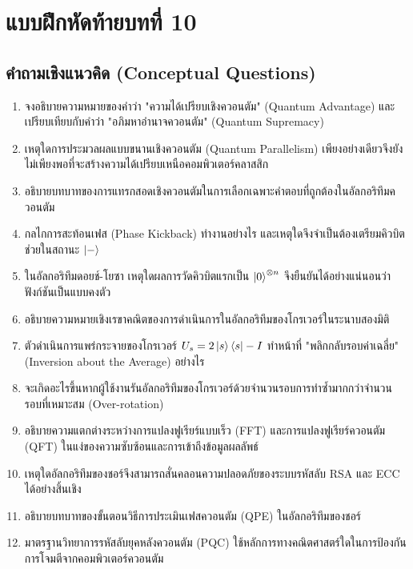 \section*{แบบฝึกหัดท้ายบทที่ 10}

\subsection*{คำถามเชิงแนวคิด (Conceptual Questions)}

\begin{enumerate}[label=\textbf{\arabic*.}]
    \item จงอธิบายความหมายของคำว่า "ความได้เปรียบเชิงควอนตัม" (Quantum Advantage) และเปรียบเทียบกับคำว่า "อภิมหาอำนาจควอนตัม" (Quantum Supremacy)
    \item เหตุใดการประมวลผลแบบขนานเชิงควอนตัม (Quantum Parallelism) เพียงอย่างเดียวจึงยังไม่เพียงพอที่จะสร้างความได้เปรียบเหนือคอมพิวเตอร์คลาสสิก
    \item อธิบายบทบาทของการแทรกสอดเชิงควอนตัมในการเลือกเฉพาะคำตอบที่ถูกต้องในอัลกอริทึมควอนตัม
    \item กลไกการสะท้อนเฟส (Phase Kickback) ทำงานอย่างไร และเหตุใดจึงจำเป็นต้องเตรียมคิวบิตช่วยในสถานะ $\ket{-}$
    \item ในอัลกอริทึมดอยช์-โยซา เหตุใดผลการวัดคิวบิตแรกเป็น $\ket{0}^{\otimes n}$ จึงยืนยันได้อย่างแน่นอนว่าฟังก์ชันเป็นแบบคงตัว
    \item อธิบายความหมายเชิงเรขาคณิตของการดำเนินการในอัลกอริทึมของโกรเวอร์ในระนาบสองมิติ
    \item ตัวดำเนินการแพร่กระจายของโกรเวอร์ $U_s = 2\ket{s}\bra{s}-I$ ทำหน้าที่ "พลิกกลับรอบค่าเฉลี่ย" (Inversion about the Average) อย่างไร
    \item จะเกิดอะไรขึ้นหากผู้ใช้งานรันอัลกอริทึมของโกรเวอร์ด้วยจำนวนรอบการทำซ้ำมากกว่าจำนวนรอบที่เหมาะสม (Over-rotation)
    \item อธิบายความแตกต่างระหว่างการแปลงฟูเรียร์แบบเร็ว (FFT) และการแปลงฟูเรียร์ควอนตัม (QFT) ในแง่ของความซับซ้อนและการเข้าถึงข้อมูลผลลัพธ์
    \item เหตุใดอัลกอริทึมของชอร์จึงสามารถสั่นคลอนความปลอดภัยของระบบรหัสลับ RSA และ ECC ได้อย่างสิ้นเชิง
    \item อธิบายบทบาทของขั้นตอนวิธีการประเมินเฟสควอนตัม (QPE) ในอัลกอริทึมของชอร์
    \item มาตรฐานวิทยาการรหัสลับยุคหลังควอนตัม (PQC) ใช้หลักการทางคณิตศาสตร์ใดในการป้องกันการโจมตีจากคอมพิวเตอร์ควอนตัม

\end{enumerate}
